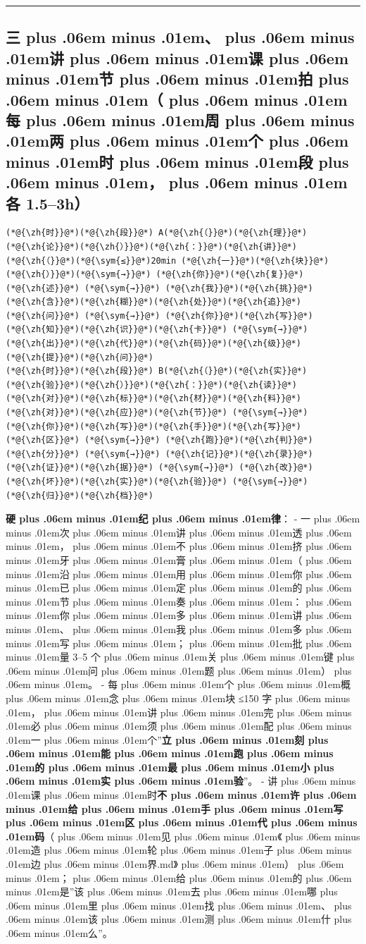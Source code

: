\documentclass[
]{article}
\def\zh#1{{\zhfont #1}}
\def\sym#1{{\symfont #1}}
\def\zhglue{\hskip0pt plus .06em minus .01em}
\begin{document}
\begin{center}\rule{0.5\linewidth}{0.5pt}\end{center}

\subsection{\zh{三\zhglue 、\zhglue 讲\zhglue 课\zhglue 节\zhglue 拍\zhglue （\zhglue 每\zhglue 周\zhglue 两\zhglue 个\zhglue 时\zhglue 段\zhglue ，\zhglue 各} 1.5--3h\zh{）}}\label{ux4e09ux8bb2ux8bfeux8282ux62cdux6bcfux5468ux4e24ux4e2aux65f6ux6bb5ux5404-1.53h}

\begin{lstlisting}
(*@{\zh{时}}@*)(*@{\zh{段}}@*) A(*@{\zh{（}}@*)(*@{\zh{理}}@*)(*@{\zh{论}}@*)(*@{\zh{）}}@*)(*@{\zh{：}}@*)(*@{\zh{讲}}@*)(*@{\zh{（}}@*)(*@{\sym{≤}}@*)20min (*@{\zh{一}}@*)(*@{\zh{块}}@*)(*@{\zh{）}}@*)(*@{\sym{→}}@*) (*@{\zh{你}}@*)(*@{\zh{复}}@*)(*@{\zh{述}}@*) (*@{\sym{→}}@*) (*@{\zh{我}}@*)(*@{\zh{挑}}@*)(*@{\zh{含}}@*)(*@{\zh{糊}}@*)(*@{\zh{处}}@*)(*@{\zh{追}}@*)(*@{\zh{问}}@*) (*@{\sym{→}}@*) (*@{\zh{你}}@*)(*@{\zh{写}}@*)(*@{\zh{知}}@*)(*@{\zh{识}}@*)(*@{\zh{卡}}@*) (*@{\sym{→}}@*) (*@{\zh{出}}@*)(*@{\zh{代}}@*)(*@{\zh{码}}@*)(*@{\zh{级}}@*)(*@{\zh{提}}@*)(*@{\zh{问}}@*)
(*@{\zh{时}}@*)(*@{\zh{段}}@*) B(*@{\zh{（}}@*)(*@{\zh{实}}@*)(*@{\zh{验}}@*)(*@{\zh{）}}@*)(*@{\zh{：}}@*)(*@{\zh{读}}@*)(*@{\zh{对}}@*)(*@{\zh{标}}@*)(*@{\zh{材}}@*)(*@{\zh{料}}@*)(*@{\zh{对}}@*)(*@{\zh{应}}@*)(*@{\zh{节}}@*) (*@{\sym{→}}@*) (*@{\zh{你}}@*)(*@{\zh{写}}@*)(*@{\zh{手}}@*)(*@{\zh{写}}@*)(*@{\zh{区}}@*) (*@{\sym{→}}@*) (*@{\zh{跑}}@*)(*@{\zh{判}}@*)(*@{\zh{分}}@*) (*@{\sym{→}}@*) (*@{\zh{记}}@*)(*@{\zh{录}}@*)(*@{\zh{证}}@*)(*@{\zh{据}}@*) (*@{\sym{→}}@*) (*@{\zh{改}}@*)(*@{\zh{坏}}@*)(*@{\zh{实}}@*)(*@{\zh{验}}@*) (*@{\sym{→}}@*) (*@{\zh{归}}@*)(*@{\zh{档}}@*)
\end{lstlisting}

\textbf{\zh{硬\zhglue 纪\zhglue 律}}\zh{：} - \zh{一\zhglue 次\zhglue 讲\zhglue 透\zhglue ，\zhglue 不\zhglue 挤\zhglue 牙\zhglue 膏\zhglue （\zhglue 沿\zhglue 用\zhglue 你\zhglue 已\zhglue 定\zhglue 的\zhglue 节\zhglue 奏\zhglue ：\zhglue 你\zhglue 多\zhglue 讲\zhglue 、\zhglue 我\zhglue 多\zhglue 写\zhglue ；\zhglue 批\zhglue 量} 3--5 \zh{个\zhglue 关\zhglue 键\zhglue 问\zhglue 题\zhglue ）\zhglue 。} - \zh{每\zhglue 个\zhglue 概\zhglue 念\zhglue 块} \sym{≤}150 \zh{字\zhglue ，\zhglue 讲\zhglue 完\zhglue 必\zhglue 须\zhglue 配\zhglue 一\zhglue 个}''\textbf{\zh{立\zhglue 刻\zhglue 能\zhglue 跑\zhglue 的\zhglue 最\zhglue 小\zhglue 实\zhglue 验}}''\zh{。} - \zh{讲\zhglue 课\zhglue 时}\textbf{\zh{不\zhglue 许\zhglue 给\zhglue 手\zhglue 写\zhglue 区\zhglue 代\zhglue 码}}\zh{（\zhglue 见\zhglue 《\zhglue 造\zhglue 轮\zhglue 子\zhglue 边\zhglue 界}.md\zh{》\zhglue ）\zhglue ；\zhglue 给\zhglue 的\zhglue 是}''\zh{该\zhglue 去\zhglue 哪\zhglue 里\zhglue 找\zhglue 、\zhglue 该\zhglue 测\zhglue 什\zhglue 么}''\zh{。}
\end{document}
